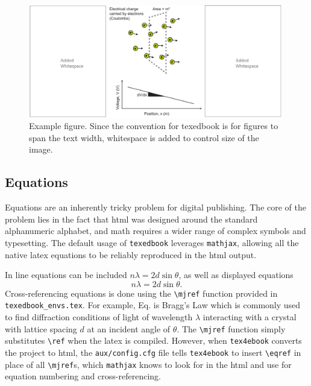 \documentclass{article}
\begin{document}
\begin{figure}[t]
    \centering
    \includegraphics[width=0.99\textwidth, keepaspectratio]{figures/fig.pdf}
    \caption{Example figure. Since the convention for texedbook is for figures to span the text width, whitespace is added to control size of the image.}
    \label{fig:example}
\end{figure}

\subsection{Equations} \label{sec:equations}
Equations are an inherently tricky problem for digital publishing. The core of the problem lies in the fact that html was designed around the standard alphanumeric alphabet, and math requires a wider range of complex symbols and typesetting. The default usage of \verb'texedbook' leverages \verb'mathjax', allowing all the native latex equations to be reliably reproduced in the html output.

In line equations can be included $n\lambda=2d \sin \theta$, as well as displayed equations 
\begin{equation}
    n\lambda=2d \sin \theta.
    \label{eq:braggslaw}
\end{equation}
Cross-referencing equations is done using the \verb'\mjref' function provided in \verb'texedbook_envs.tex'. For example, Eq.  is Bragg's Law which is commonly used to find diffraction conditions of light of wavelength $\lambda$ interacting with a crystal with lattice spacing $d$ at an incident angle of $\theta$. The \verb'\mjref' function simply substitutes \verb'\ref' when the latex is compiled. However, when \verb'tex4ebook' converts the project to html, the \verb'aux/config.cfg' file tells \verb'tex4ebook' to insert \verb'\eqref' in place of all \verb'\mjref's, which \verb'mathjax' knows to look for in the html and use for equation numbering and cross-referencing. 
\end{document}
